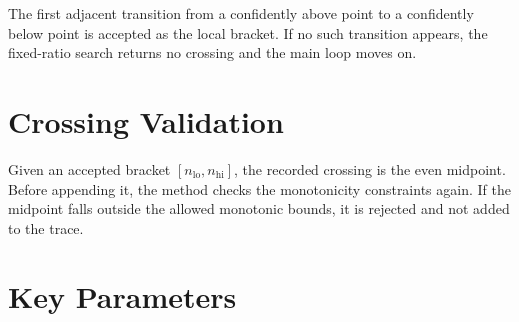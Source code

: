 \documentclass[11pt]{article}
\begin{document}
The first adjacent transition from a confidently above point to a confidently
below point is accepted as the local bracket. If no such transition appears,
the fixed-ratio search returns no crossing and the main loop moves on.

\section{Crossing Validation}

Given an accepted bracket $[n_{\mathrm{lo}}, n_{\mathrm{hi}}]$, the recorded
crossing is the even midpoint. Before appending it, the method checks the
monotonicity constraints again. If the midpoint falls outside the allowed
monotonic bounds, it is rejected and not added to the trace.

\section{Key Parameters}
\end{document}
